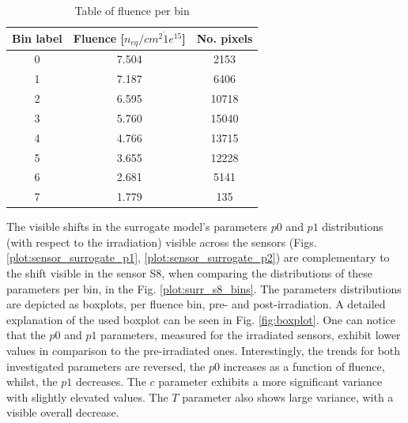 \begin{table}[h]
\begin{center}
\begin{tabular}{ |c|c|c| }
\hline
Bin label & Fluence [$n_{eq}/cm^{2} \dot 1e^{15}$] & No. pixels \\
\hline
  0 & 7.504 & 2153  \\

\hline
  1 & 7.187 & 6406 \\

\hline
  2 & 6.595 & 10718 \\

\hline
  3 & 5.760 & 15040 \\
\hline
  4 & 4.766 & 13715 \\
\hline
  5 & 3.655 & 12228  \\
\hline
  6 & 2.681 & 5141   \\
\hline
  7 & 1.779 & 135\\
\hline
\end{tabular}
\caption{Table of fluence per bin}
\label{tab:fluence_per_bin}
\end{center}
\end{table}

The visible shifts in the surrogate model's parameters $p0$ and $p1$ distributions (with respect to the irradiation) visible across the sensors (Figs. \ref{plot:sensor_surrogate_p1}, \ref{plot:sensor_surrogate_p2}) are complementary to the shift visible in the sensor S8, when comparing the distributions of these parameters per bin, in the Fig. \ref{plot:surr_s8_bins}.
The parameters distributions are depicted as boxplots, per fluence bin, pre- and post-irradiation.
A detailed explanation of the used boxplot can be seen in Fig. \ref{fig:boxplot}.
One can notice that the $p0$ and $p1$ parameters, measured for the irradiated sensors, exhibit lower values in comparison to the pre-irradiated ones.
Interestingly, the trends for both investigated parameters are reversed, the $p0$ increases as a function of fluence, whilst, the $p1$ decreases.
The $c$ parameter exhibits a more significant variance with slightly elevated values.
The $T$ parameter also shows large variance, with a visible overall decrease.

